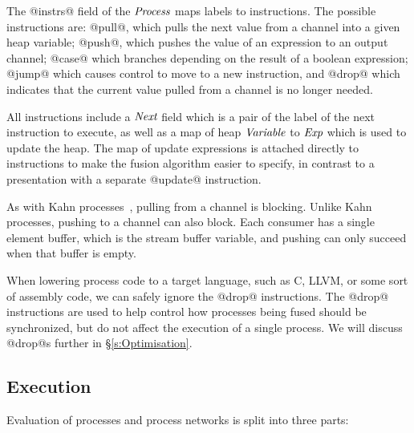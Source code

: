 The @instrs@ field of the $\textit{Process}$ maps labels to instructions. The possible instructions are: @pull@, which pulls the next value from a channel into a given heap variable; @push@, which pushes the value of an expression to an output channel; @case@ which branches depending on the result of a boolean expression; @jump@ which causes control to move to a new instruction, and @drop@ which indicates that the current value pulled from a channel is no longer needed. 

All instructions include a $\textit{Next}$ field which is a pair of the label of the next instruction to execute, as well as a map of heap $\textit{Variable}$ to $\textit{Exp}$ which is used to update the heap. The map of update expressions is attached directly to instructions to make the fusion algorithm easier to specify, in contrast to a presentation with a separate @update@ instruction. 

As with Kahn processes~\cite{kahn1976coroutines}, pulling from a channel is blocking. Unlike Kahn processes, pushing to a channel can also block. Each consumer has a single element buffer, which is the stream buffer variable, and pushing can only succeed when that buffer is empty.

When lowering process code to a target language, such as C, LLVM, or some sort of assembly code, we can safely ignore the @drop@ instructions. The @drop@ instructions are used to help control how processes being fused should be synchronized, but do not affect the execution of a single process. We will discuss @drop@s further in \S\ref{s:Optimisation}.


\subsection{Execution}
\label{s:Process:Eval}




Evaluation of processes and process networks is split into three parts:

